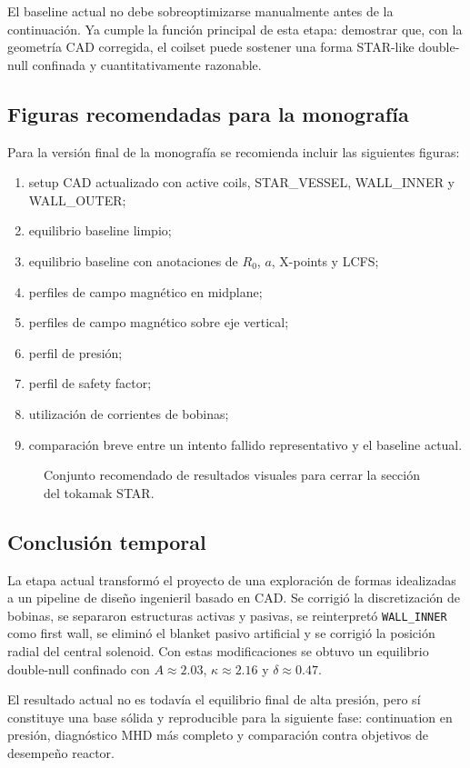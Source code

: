 \documentclass[11pt,a4paper]{article}
\begin{document}
El baseline actual no debe sobreoptimizarse manualmente antes de la continuación. Ya cumple la
función principal de esta etapa: demostrar que, con la geometría CAD corregida, el coilset puede
sostener una forma STAR-like double-null confinada y cuantitativamente razonable.

\subsection{Figuras recomendadas para la monografía}
Para la versión final de la monografía se recomienda incluir las siguientes figuras:

\begin{enumerate}
    \item setup CAD actualizado con active coils, STAR\_VESSEL, WALL\_INNER y WALL\_OUTER;
    \item equilibrio baseline limpio;
    \item equilibrio baseline con anotaciones de $R_0$, $a$, X-points y LCFS;
    \item perfiles de campo magnético en midplane;
    \item perfiles de campo magnético sobre eje vertical;
    \item perfil de presión;
    \item perfil de safety factor;
    \item utilización de corrientes de bobinas;
    \item comparación breve entre un intento fallido representativo y el baseline actual.
\end{enumerate}

\begin{figure}[htbp]
\centering
{}
\caption{Conjunto recomendado de resultados visuales para cerrar la sección del tokamak STAR.}
\label{fig:final_results_panel_placeholder}
\end{figure}

\subsection{Conclusión temporal}
La etapa actual transformó el proyecto de una exploración de formas idealizadas a un pipeline
de diseño ingenieril basado en CAD. Se corrigió la discretización de bobinas, se separaron
estructuras activas y pasivas, se reinterpretó \texttt{WALL\_INNER} como first wall, se eliminó
el blanket pasivo artificial y se corrigió la posición radial del central solenoid. Con estas
modificaciones se obtuvo un equilibrio double-null confinado con $A\approx2.03$, $\kappa\approx2.16$
y $\delta\approx0.47$.

El resultado actual no es todavía el equilibrio final de alta presión, pero sí constituye una
base sólida y reproducible para la siguiente fase: continuation en presión, diagnóstico MHD más
completo y comparación contra objetivos de desempeño reactor.
\end{document}
